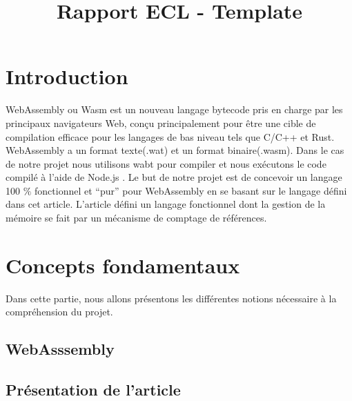 \documentclass{rapportECL}
\title{Rapport ECL - Template} %
\begin{document}





\fairemarges %
\fairepagedegarde %
\tabledematieres %

\section{Introduction}
WebAssembly ou Wasm \cite{noauthor_webassembly_nodate} est un nouveau langage bytecode pris en charge par les principaux navigateurs Web, 
conçu principalement pour être une cible de compilation efficace pour les langages de bas niveau tels que C/C++ et Rust\cite{haas_bringing_2017}.
WebAssembly a un format texte(.wat) et un format binaire(.wasm). 
Dans le cas de notre projet nous utilisons wabt\cite{noauthor_wabt_2023} pour compiler et nous exécutons le code compilé à l’aide de Node.js \cite{noauthor_nodejs_nodate}.
Le but de notre projet est de concevoir un langage 100 $\%$ fonctionnel et “pur” pour WebAssembly en se basant sur le langage défini dans 
cet article\cite{ullrich_counting_2020}. L'article défini un langage fonctionnel dont la gestion de la mémoire se fait par 
un mécanisme de comptage de références.

\section{Concepts fondamentaux}
Dans cette partie, nous allons présentons les différentes notions nécessaire à la compréhension du projet.
\subsection{WebAsssembly}
\subsection{Présentation de l'article}
\end{document}
